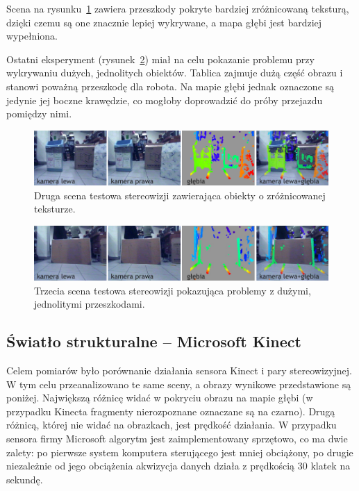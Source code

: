 Scena na rysunku~\ref{fig:stereo_2} zawiera przeszkody pokryte bardziej zróżnicowaną
teksturą, dzięki czemu są one znacznie lepiej wykrywane, a mapa głębi jest bardziej
wypełniona.

Ostatni eksperyment (rysunek~\ref{fig:stereo_3}) miał na celu pokazanie problemu
przy wykrywaniu dużych, jednolitych obiektów. Tablica zajmuje dużą część obrazu
i stanowi poważną przeszkodę dla robota. Na mapie głębi jednak oznaczone są jedynie
jej boczne krawędzie, co mogłoby doprowadzić do próby przejazdu pomiędzy nimi.

\begin{figure}[h!]
\centering
\includegraphics{../../Common/img/stereo_2}
\caption[Druga scena testowa stereowizji]{Druga scena testowa stereowizji zawierająca obiekty o zróżnicowanej teksturze.}
\label{fig:stereo_2}
\end{figure}

\begin{figure}[h!]
\centering
\includegraphics{../../Common/img/stereo_3}
\caption[Trzecia scena testowa stereowizji]{Trzecia scena testowa stereowizji pokazująca problemy z dużymi, jednolitymi przeszkodami.}
\label{fig:stereo_3}
\end{figure} 

\subsection{Światło strukturalne -- Microsoft Kinect}

Celem pomiarów było porównanie działania sensora Kinect i pary stereowizyjnej.
W tym celu przeanalizowano te same sceny, a obrazy wynikowe przedstawione są
poniżej. Największą różnicę widać w pokryciu obrazu na mapie głębi (w przypadku
Kinecta fragmenty nierozpoznane oznaczane są na czarno). Drugą różnicą, której
nie widać na obrazkach, jest prędkość działania. W przypadku sensora
firmy Microsoft algorytm jest zaimplementowany sprzętowo, co ma dwie zalety:
po pierwsze system komputera sterującego jest mniej obciążony, po drugie niezależnie
od jego obciążenia akwizycja danych działa z prędkością 30 klatek na sekundę.

